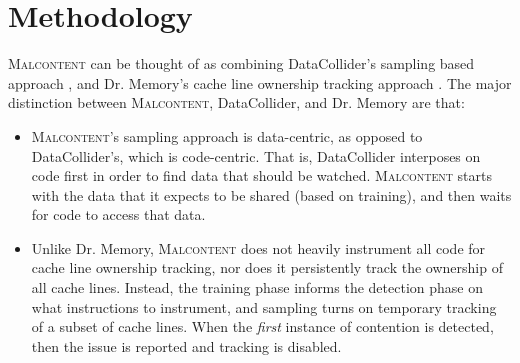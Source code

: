 \documentclass[letterpaper,twocolumn,10pt]{article}
\newcommand{\TextToolname}{Malcontent}
\newcommand{\Toolname}{\textsc{\TextToolname{}}}
\begin{document}


\section{Methodology}\label{sec:methodology}

\Toolname{} can be thought of as combining DataCollider's sampling based approach \cite{DataCollider}, and Dr. Memory's
cache line ownership tracking approach \cite{DrContention}. The major distinction between \Toolname, DataCollider, and
Dr. Memory are that:
\begin{itemize}
\item \Toolname's sampling approach is data-centric, as opposed to DataCollider's, which is code-centric. That is, DataCollider
interposes on code first in order to find data that should be watched. \Toolname{} starts with the data that it expects to
be shared (based on training), and then waits for code to access that data.

\item Unlike Dr. Memory, \Toolname{} does not heavily instrument all code for cache line ownership tracking, nor does it
persistently track the ownership of all cache lines. Instead, the training phase informs the detection phase on what
instructions to instrument, and sampling turns on temporary tracking of a subset of cache lines. When the \emph{first}
instance of contention is detected, then the issue is reported and tracking is disabled.
\end{itemize}

\end{document}
